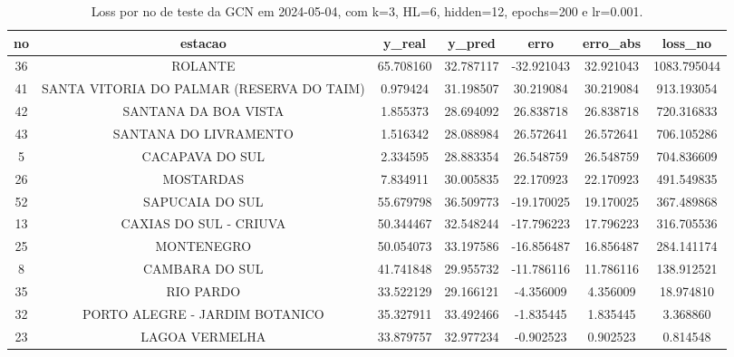 \begin{table}[h]
\centering
\caption{Loss por no de teste da GCN em 2024-05-04, com k=3, HL=6, hidden=12, epochs=200 e lr=0.001.}
\label{tab:gcn_loss_k3_hl6_h12_e200_d20240504}
\begin{tabular}{ccccccc}
\toprule
no & estacao & y\_real & y\_pred & erro & erro\_abs & loss\_no \\
\midrule
36 & ROLANTE & 65.708160 & 32.787117 & -32.921043 & 32.921043 & 1083.795044 \\
41 & SANTA VITORIA DO PALMAR (RESERVA DO TAIM) & 0.979424 & 31.198507 & 30.219084 & 30.219084 & 913.193054 \\
42 & SANTANA DA BOA VISTA & 1.855373 & 28.694092 & 26.838718 & 26.838718 & 720.316833 \\
43 & SANTANA DO LIVRAMENTO & 1.516342 & 28.088984 & 26.572641 & 26.572641 & 706.105286 \\
5 & CACAPAVA DO SUL & 2.334595 & 28.883354 & 26.548759 & 26.548759 & 704.836609 \\
26 & MOSTARDAS & 7.834911 & 30.005835 & 22.170923 & 22.170923 & 491.549835 \\
52 & SAPUCAIA DO SUL & 55.679798 & 36.509773 & -19.170025 & 19.170025 & 367.489868 \\
13 & CAXIAS DO SUL - CRIUVA & 50.344467 & 32.548244 & -17.796223 & 17.796223 & 316.705536 \\
25 & MONTENEGRO & 50.054073 & 33.197586 & -16.856487 & 16.856487 & 284.141174 \\
8 & CAMBARA DO SUL & 41.741848 & 29.955732 & -11.786116 & 11.786116 & 138.912521 \\
35 & RIO PARDO & 33.522129 & 29.166121 & -4.356009 & 4.356009 & 18.974810 \\
32 & PORTO ALEGRE - JARDIM BOTANICO & 35.327911 & 33.492466 & -1.835445 & 1.835445 & 3.368860 \\
23 & LAGOA VERMELHA & 33.879757 & 32.977234 & -0.902523 & 0.902523 & 0.814548 \\
\bottomrule
\end{tabular}
\end{table}
